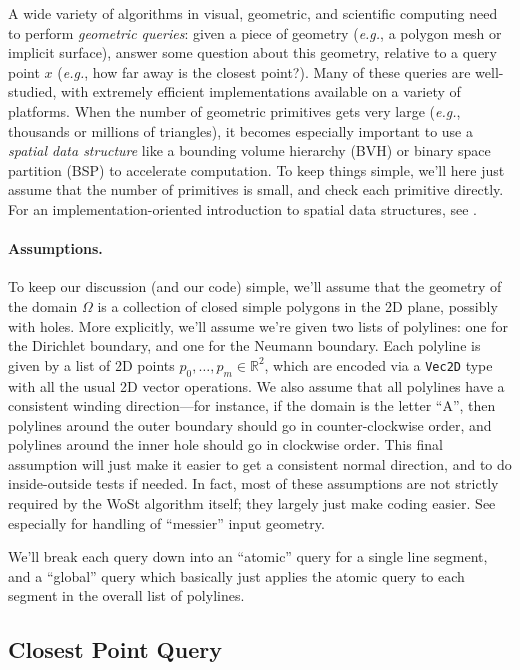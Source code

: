 \documentclass{article}
\newcommand{\code}[1]{\texttt{\small{#1}}}
\newcommand{\eg}{\emph{e.g.}} %
\renewcommand{\vec}[1]{#1}
\begin{document}
A wide variety of algorithms in visual, geometric, and scientific computing need to perform \emph{geometric queries}: given a piece of geometry (\eg{}, a polygon mesh or implicit surface), answer some question about this geometry, relative to a query point \(x\) (\eg{}, how far away is the closest point?).  Many of these queries are well-studied, with extremely efficient implementations available on a variety of platforms.  When the number of geometric primitives gets very large (\eg{}, thousands or millions of triangles), it becomes especially important to use a \emph{spatial data structure} like a bounding volume hierarchy (BVH) or binary space partition (BSP) to accelerate computation.  To keep things simple, we'll here just assume that the number of primitives is small, and check each primitive directly.  For an implementation-oriented introduction to spatial data structures, see \citet[Section 4.2]{pharr2016physically}.

\paragraph{Assumptions.} To keep our discussion (and our code) simple, we'll assume that the geometry of the domain \(\Omega\) is a collection of closed simple polygons in the 2D plane, possibly with holes.  More explicitly, we'll assume we're given two lists of polylines: one for the Dirichlet boundary, and one for the Neumann boundary.  Each polyline is given by a list of 2D points \(\vec{p}_0, \ldots, \vec{p}_m \in \mathbb{R}^2\), which are encoded via a \code{Vec2D} type with all the usual 2D vector operations.  We also assume that all polylines have a consistent winding direction---for instance, if the domain is the letter ``A'', then polylines around the outer boundary should go in counter-clockwise order, and polylines around the inner hole should go in clockwise order.  This final assumption will just make it easier to get a consistent normal direction, and to do inside-outside tests if needed.  In fact, most of these assumptions are not strictly required by the WoSt algorithm itself; they largely just make coding easier.  See especially \citet[Appendix B]{Sawhney:2023:WoSt} for handling of ``messier'' input geometry.

We'll break each query down into an ``atomic'' query for a single line segment, and a ``global'' query which basically just applies the atomic query to each segment in the overall list of polylines.

\subsection{Closest Point Query}
\label{sec:ClosestPointQuery}
\end{document}
